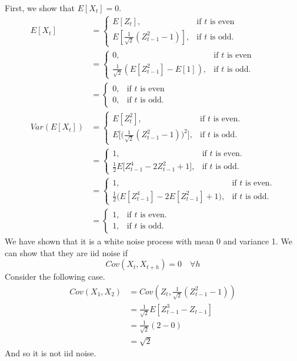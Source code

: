 \documentclass[10pt,a4paper]{exam}
\begin{document}
\begin{questions}
\begin{solution}
First, we show that $E[X_t] = 0$.
\begin{align*}
E[X_t]		&= \begin{cases}
					E[Z_t], & \text{if }t\text{ is even}\\
					E[\frac{1}{\sqrt{2}}(Z_{t-1}^2 - 1)], & \text{if }t\text{ is odd.}
				\end{cases}\\
				&= \begin{cases}
					0, & \text{if }t\text{ is even}\\
					\frac{1}{\sqrt{2}}(E[Z_{t-1}^2] - E[1]), & \text{if }t\text{ is odd.}
				\end{cases}\\
				&= \begin{cases}
					0, & \text{if }t\text{ is even}\\
					0, & \text{if }t\text{ is odd.}
				\end{cases}\\
Var(E[X_t]) 		&= \begin{cases}
							E[Z_t^2],& \text{if }t\text{ is even.}\\
							E\Big[\Big(\frac{1}{\sqrt{2}}(Z_{t-1}^2 - 1)\Big)^2\Big],& \text{if }t\text{ is odd.}
						\end{cases}\\
						&= \begin{cases}
							1,& \text{if }t\text{ is even.}\\
							\frac{1}{2}E\Big[Z_{t-1}^4 - 2Z_{t-1}^2 + 1\Big],& \text{if }t\text{ is odd.}
						\end{cases}\\
						&= \begin{cases}
							1,& \text{if }t\text{ is even.}\\
							\frac{1}{2}\Big(E[Z_{t-1}^4] - 2E[Z_{t-1}^2] + 1\Big),& \text{if }t\text{ is odd.}
						\end{cases}\\
						&= \begin{cases}
							1,& \text{if }t\text{ is even.}\\
							1,& \text{if }t\text{ is odd.}
						\end{cases}
\end{align*}
We have shown that it is a white noise process with mean 0 and variance 1. We can show that they are iid noise if
$$Cov(X_t, X_{t+h}) = 0 \quad \forall h$$
Consider the following case.
\begin{align*}
Cov(X_1, X_2)		&= Cov\left(Z_t, \frac{1}{\sqrt{2}}(Z_{t-1}^2 - 1)\right)\\
							&= \frac{1}{\sqrt{2}} E[Z_{t-1}^3 - Z_{t-1}]\\
							&= \frac{1}{\sqrt{2}} (2 - 0)\\
							&= \sqrt{2}
\end{align*}
And so it is not iid noise.
\end{solution}


\end{questions}
\end{document}
